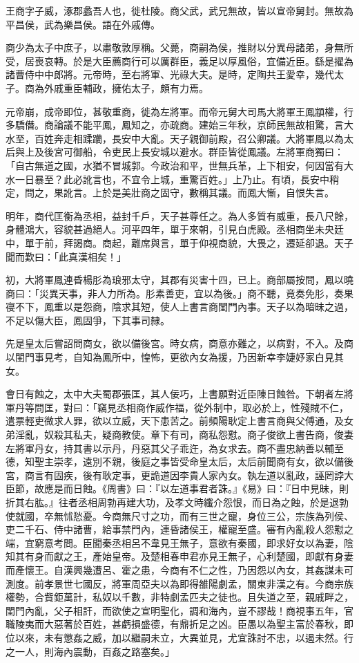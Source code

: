
\begin{pinyinscope}
王商字子威，涿郡蠡吾人也，徙杜陵。商父武，武兄無故，皆以宣帝舅封。無故為平昌侯，武為樂昌侯。語在外戚傳。

商少為太子中庶子，以肅敬敦厚稱。父薨，商嗣為侯，推財以分異母諸弟，身無所受，居喪哀轉。於是大臣薦商行可以厲群臣，義足以厚風俗，宜備近臣。繇是擢為諸曹侍中中郎將。元帝時，至右將軍、光祿大夫。是時，定陶共王愛幸，幾代太子。商為外戚重臣輔政，擁佑太子，頗有力焉。

元帝崩，成帝即位，甚敬重商，徙為左將軍。而帝元舅大司馬大將軍王鳳顓權，行多驕僭。商論議不能平鳳，鳳知之，亦疏商。建始三年秋，京師民無故相驚，言大水至，百姓奔走相蹂躪，長安中大亂。天子親御前殿，召公卿議。大將軍鳳以為太后與上及後宮可御船，令吏民上長安城以避水。群臣皆從鳳議。左將軍商獨曰：「自古無道之國，水猶不冒城郭。今政治和平，世無兵革，上下相安，何因當有大水一日暴至？此必訛言也，不宜令上城，重驚百姓。」上乃止。有頃，長安中稍定，問之，果訛言。上於是美壯商之固守，數稱其議。而鳳大慚，自恨失言。

明年，商代匡衡為丞相，益封千戶，天子甚尊任之。為人多質有威重，長八尺餘，身體鴻大，容貌甚過絕人。河平四年，單于來朝，引見白虎殿。丞相商坐未央廷中，單于前，拜謁商。商起，離席與言，單于仰視商貌，大畏之，遷延卻退。天子聞而歎曰：「此真漢相矣！」

初，大將軍鳳連昏楊肜為琅邪太守，其郡有災害十四，已上。商部屬按問，鳳以曉商曰：「災異天事，非人力所為。肜素善吏，宜以為後。」商不聽，竟奏免肜，奏果寑不下，鳳重以是怨商，陰求其短，使人上書言商閨門內事。天子以為暗昧之過，不足以傷大臣，鳳固爭，下其事司隸。

先是皇太后嘗詔問商女，欲以備後宮。時女病，商意亦難之，以病對，不入。及商以閨門事見考，自知為鳳所中，惶怖，更欲內女為援，乃因新幸李婕妤家白見其女。

會日有蝕之，太中大夫蜀郡張匡，其人佞巧，上書願對近臣陳日蝕咎。下朝者左將軍丹等問匡，對曰：「竊見丞相商作威作福，從外制中，取必於上，性殘賊不仁，遣票輕吏微求人罪，欲以立威，天下患苦之。前頻陽耿定上書言商與父傅通，及女弟淫亂，奴殺其私夫，疑商教使。章下有司，商私怨懟。商子俊欲上書告商，俊妻左將軍丹女，持其書以示丹，丹惡其父子乖迕，為女求去。商不盡忠納善以輔至德，知聖主崇孝，遠別不親，後庭之事皆受命皇太后，太后前聞商有女，欲以備後宮，商言有固疾，後有耿定事，更詭道因李貴人家內女。執左道以亂政，誣罔誖大臣節，故應是而日蝕。《周書》曰：『以左道事君者誅。』《易》曰：『日中見昧，則折其右肱。』往者丞相周勃再建大功，及孝文時纖介怨恨，而日為之蝕，於是退勃使就國，卒無怵悐憂。今商無尺寸之功，而有三世之寵，身位三公，宗族為列侯、吏二千石、侍中諸曹，給事禁門內，連昏諸侯王，權寵至盛。審有內亂殺人怨懟之端，宜窮意考問。臣聞秦丞相呂不韋見王無子，意欲有秦國，即求好女以為妻，陰知其有身而獻之王，產始皇帝。及楚相春申君亦見王無子，心利楚國，即獻有身妻而產懷王。自漢興幾遭呂、霍之患，今商有不仁之性，乃因怨以內女，其姦謀未可測度。前孝景世七國反，將軍周亞夫以為即得雒陽劇孟，關東非漢之有。今商宗族權勢，合貲鉅萬計，私奴以千數，非特劇孟匹夫之徒也。且失道之至，親戚畔之，閨門內亂，父子相訐，而欲使之宣明聖化，調和海內，豈不謬哉！商視事五年，官職陵夷而大惡著於百姓，甚虧損盛德，有鼎折足之凶。臣愚以為聖主富於春秋，即位以來，未有懲姦之威，加以繼嗣未立，大異並見，尤宜誅討不忠，以遏未然。行之一人，則海內震動，百姦之路塞矣。」


\end{pinyinscope}
